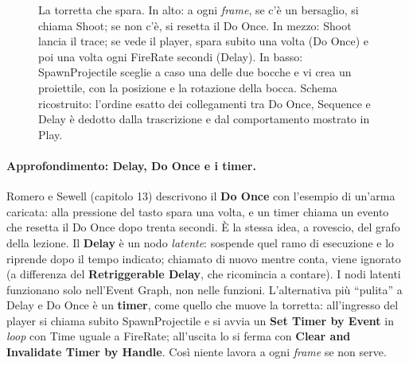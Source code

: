\begin{figure}[htbp]
\caption{La torretta che spara. In alto: a ogni \emph{frame}, se c'è un bersaglio, si
chiama Shoot; se non c'è, si resetta il Do Once. In mezzo: Shoot lancia il trace; se
vede il player, spara subito una volta (Do Once) e poi una volta ogni FireRate secondi
(Delay). In basso: SpawnProjectile sceglie a caso una delle due bocche e vi crea un
proiettile, con la posizione e la rotazione della bocca. Schema ricostruito: l'ordine
esatto dei collegamenti tra Do Once, Sequence e Delay è dedotto dalla trascrizione e
dal comportamento mostrato in Play.}
\label{ue5:fig:sparo}
\end{figure}

\paragraph{Approfondimento: Delay, Do Once e i timer.} Romero e Sewell (capitolo 13)
descrivono il \textbf{Do Once} con l'esempio di un'arma caricata: alla pressione del
tasto spara una volta, e un timer chiama un evento che resetta il Do Once dopo trenta
secondi. È la stessa idea, a rovescio, del grafo della lezione. Il \textbf{Delay} è un
nodo \emph{latente}: sospende quel ramo di esecuzione e lo riprende dopo il tempo
indicato; chiamato di nuovo mentre conta, viene ignorato (a differenza del
\textbf{Retriggerable Delay}, che ricomincia a contare). I nodi latenti funzionano solo
nell'Event Graph, non nelle funzioni. L'alternativa più ``pulita'' a Delay e Do Once è
un \textbf{timer}, come quello che muove la torretta: all'ingresso del player si chiama
subito SpawnProjectile e si avvia un \textbf{Set Timer by Event} in \emph{loop} con Time
uguale a FireRate; all'uscita lo si ferma con \textbf{Clear and Invalidate Timer by
Handle}. Così niente lavora a ogni \emph{frame} se non serve.

